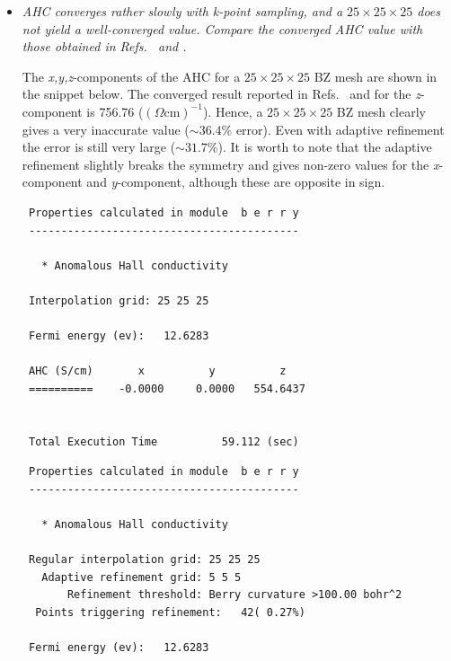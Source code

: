 \begin{itemize}
	\item {\it AHC converges rather slowly with k-point sampling, and a $25 \times 25 \times 25$ does not yield a well-converged value.
	Compare the converged AHC value with those obtained in Refs.~ and .}

	The {\it x,y,z}-components of the AHC for a $25\times25\times25$ BZ mesh are shown in the snippet below. The converged result reported in Refs.~ and  for the \textit{z}-component is 756.76 ($(\Omega \mathrm{cm})^{-1}$). Hence, a $25\times25\times25$ BZ mesh clearly gives a very inaccurate value ($\sim 36.4\%$ error). Even with adaptive refinement the error is still very large ($\sim 31.7\%$). It is worth to note that the adaptive refinement slightly breaks the symmetry and gives non-zero values for the \textit{x}-component and \textit{y}-component, although these are opposite in sign.  

\begin{tcolorbox}[title=Without adaptive refinement,sharp corners,boxrule=0.5pt]
{\small
\begin{verbatim}
 Properties calculated in module  b e r r y
 ------------------------------------------

   * Anomalous Hall conductivity
  
 Interpolation grid: 25 25 25

 Fermi energy (ev):   12.6283

 AHC (S/cm)       x          y          z
 ==========    -0.0000     0.0000   554.6437


 Total Execution Time          59.112 (sec)

\end{verbatim}
}
\end{tcolorbox}

\begin{tcolorbox}[title=With adaptive refinement,sharp corners,boxrule=0.5pt]
{\small
\begin{verbatim}
 Properties calculated in module  b e r r y
 ------------------------------------------

   * Anomalous Hall conductivity
  
 Regular interpolation grid: 25 25 25
   Adaptive refinement grid: 5 5 5
       Refinement threshold: Berry curvature >100.00 bohr^2
  Points triggering refinement:   42( 0.27%)

 Fermi energy (ev):   12.6283


\end{verbatim}}
\end{tcolorbox}
\end{itemize}
